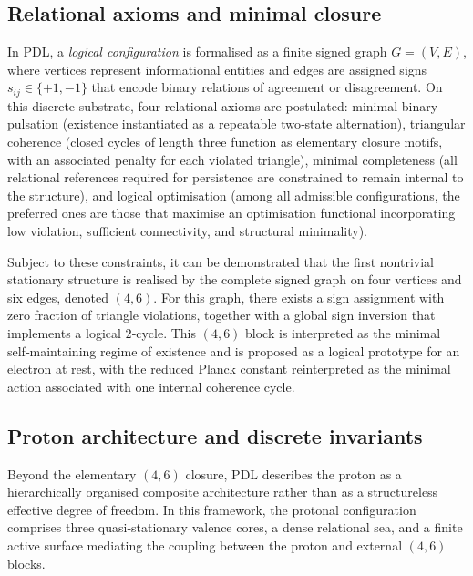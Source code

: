 \documentclass[11pt,a4paper]{article}
\begin{document}
\subsection{Relational axioms and minimal closure}
In PDL, a \emph{logical configuration} is formalised as a finite signed graph $G = (V,E)$, where vertices represent informational entities and edges are assigned signs $s_{ij} \in \{+1,-1\}$ that encode binary relations of agreement or disagreement.\cite{Laubscher2026IntroPDL} On this discrete substrate, four relational axioms are postulated: minimal binary pulsation (existence instantiated as a repeatable two‑state alternation), triangular coherence (closed cycles of length three function as elementary closure motifs, with an associated penalty for each violated triangle), minimal completeness (all relational references required for persistence are constrained to remain internal to the structure), and logical optimisation (among all admissible configurations, the preferred ones are those that maximise an optimisation functional incorporating low violation, sufficient connectivity, and structural minimality).\cite{Laubscher2026IntroPDL,Laubscher2026FullPDL}

Subject to these constraints, it can be demonstrated that the first nontrivial stationary structure is realised by the complete signed graph on four vertices and six edges, denoted $(4,6)$. For this graph, there exists a sign assignment with zero fraction of triangle violations, together with a global sign inversion that implements a logical $2$‑cycle.\cite{Laubscher2026IntroPDL} This $(4,6)$ block is interpreted as the minimal self‑maintaining regime of existence and is proposed as a logical prototype for an electron at rest, with the reduced Planck constant reinterpreted as the minimal action associated with one internal coherence cycle.\cite{Laubscher2026FullPDL}

\subsection{Proton architecture and discrete invariants}
Beyond the elementary $(4,6)$ closure, PDL describes the proton as a hierarchically organised composite architecture rather than as a structureless effective degree of freedom.\cite{Laubscher2026FullPDL,Laubscher2026CombinatorialProton} In this framework, the protonal configuration comprises three quasi‑stationary valence cores, a dense relational sea, and a finite active surface mediating the coupling between the proton and external $(4,6)$ blocks.\cite{Laubscher2026FullPDL}
\end{document}

